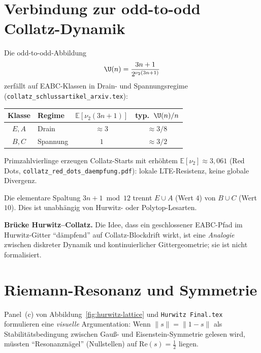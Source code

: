 \documentclass[12pt,a4paper]{article}
\begin{document}
\section{Verbindung zur odd-to-odd Collatz-Dynamik}
\label{sec:collatz}

Die odd-to-odd-Abbildung
\[
\U(n)=\frac{3n+1}{2^{\nu_2(3n+1)}}
\]
zerfällt auf EABC-Klassen in Drain- und Spannungsregime
(\texttt{collatz\_schlussartikel\_arxiv.tex}):
\begin{center}
\renewcommand{\arraystretch}{1.2}
\begin{tabular}{clcc}
\toprule
Klasse & Regime & $\mathbb{E}[\nu_2(3n+1)]$ & typ.\ $\U(n)/n$ \\
\midrule
$E,A$ & Drain & $\approx 3$ & $\approx 3/8$ \\
$B,C$ & Spannung & $1$ & $\approx 3/2$ \\
\bottomrule
\end{tabular}
\end{center}

Primzahlvierlinge erzeugen Collatz-Starts mit erhöhtem
$\mathbb{E}[\nu_2]\approx 3{,}061$ (Red Dots, \texttt{collatz\_red\_dots\_daempfung.pdf}):
lokale LTE-Resistenz, keine globale Divergenz.

\begin{tcolorbox}[bewiesen]
Die elementare Spaltung $3n+1\bmod 12$ trennt
$E\cup A$ (Wert $4$) von $B\cup C$ (Wert $10$).
Dies ist unabhängig von Hurwitz- oder Polytop-Lesarten.
\end{tcolorbox}

\begin{tcolorbox}[heuristik]
\textbf{Brücke Hurwitz--Collatz.}
Die Idee, dass ein geschlossener EABC-Pfad im Hurwitz-Gitter
``dämpfend'' auf Collatz-Blockdrift wirkt, ist eine
\emph{Analogie} zwischen diskreter Dynamik und
kontinuierlicher Gittergeometrie; sie ist nicht formalisiert.
\end{tcolorbox}

\section{Riemann-Resonanz und Symmetrie}
\label{sec:riemann}

Panel~(c) von Abbildung~\ref{fig:hurwitz-lattice} und
\texttt{Hurwitz Final.tex} formulieren eine \emph{visuelle} Argumentation:
Wenn $\|s\|=\|1-s\|$ als Stabilitätsbedingung zwischen
Gauß- und Eisenstein-Symmetrie gelesen wird, müssten
``Resonanznägel'' (Nullstellen) auf $\mathrm{Re}(s)=\tfrac12$ liegen.
\end{document}
